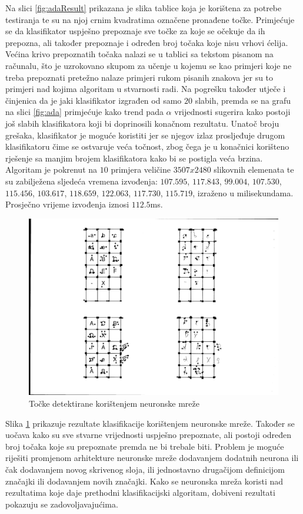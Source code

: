 \documentclass[times, utf8, zavrsni, numeric]{fer}
\begin{document}
Na slici \ref{fig:adaResult} prikazana je slika tablice koja je korištena za potrebe testiranja te su na njoj crnim kvadratima označene pronađene točke.
Primjećuje se da klasifikator uspješno prepoznaje sve točke za koje se očekuje da ih prepozna, ali također prepoznaje i određen broj točaka koje nisu vrhovi ćelija.
Većina krivo prepoznatih točaka nalazi se u tablici sa tekstom pisanom na računalu, što je uzrokovano skupom za učenje u kojemu se kao primjeri koje ne treba prepoznati pretežno nalaze primjeri rukom pisanih znakova jer su to primjeri nad kojima algoritam u stvarnosti radi.
Na pogrešku također utječe i činjenica da je jaki klasifikator izgrađen od samo $20$ slabih, premda se na grafu na slici \ref{fig:ada} primjećuje kako trend pada $\alpha$ vrijednosti sugerira kako postoji još slabih klasifikatora koji bi doprinosili konačnom rezultatu.
Unatoč broju grešaka, klasifikator je moguće koristiti jer se njegov izlaz prosljeđuje drugom klasifikatoru čime se ostvaruje veća točnost, zbog čega je u konačnici korišteno rješenje sa manjim brojem klasifikatora kako bi se postigla veća brzina.\\

Algoritam je pokrenut na $10$ primjera veličine $3507x2480$ slikovnih elemenata te su zabilježena sljedeća vremena izvođenja: $107.595$, $117.843$, $99.004$, $107.530$, $115.456$, $103.617$, $118.659$, $122.063$, $117.730$, $115.719$, izraženo u milisekundama. 
Prosječno vrijeme izvođenja iznosi $112.5$ms.

\begin{figure}[!ht]
    \centering
    \includegraphics[width=.75\linewidth]{Images/neural.png}
    \captionsetup{justification=centering}
    \caption{Točke detektirane korištenjem neuronske mreže}
    \label{fig:neuralResult}
\end{figure}

Slika \ref{fig:neuralResult} prikazuje rezultate klasifikacije korištenjem neuronske mreže. 
Također se uočava kako su sve stvarne vrijednosti uspješno prepoznate, ali postoji određen broj točaka koje su prepoznate premda ne bi trebale biti. 
Problem je moguće riješiti promjenom arhitekture neuronske mreže dodavanjem dodatnih neurona ili čak dodavanjem novog skrivenog sloja, ili jednostavno drugačijom definicijom značajki ili dodavanjem novih značajki.
Kako se neuronska mreža koristi nad rezultatima koje daje prethodni klasifikacijski algoritam, dobiveni rezultati pokazuju se zadovoljavajućima.\\
\end{document}
